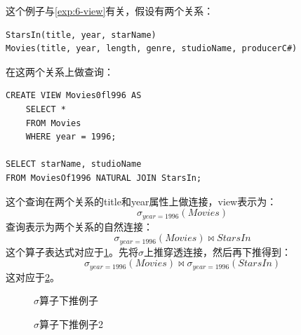 \begin{example}
    这个例子与\examplename\ref{exp:6-view}有关，假设有两个关系：
\begin{lstlisting}[style=verbose]
StarsIn(title, year, starName)
Movies(title, year, length, genre, studioName, producerC#)
\end{lstlisting}
在这两个关系上做查询：
\begin{lstlisting}[style=verbose]
CREATE VIEW Movies0fl996 AS
    SELECT *
    FROM Movies
    WHERE year = 1996;

SELECT starName, studioName
FROM MoviesOf1996 NATURAL JOIN StarsIn;
\end{lstlisting}
    这个查询在两个关系的title和year属性上做连接，view表示为：
    $$\sigma_{year = 1996}(Movies)$$
查询表示为两个关系的自然连接：
    $$\sigma_{year = 1996}(Movies) \bowtie StarsIn$$
    这个算子表达式对应于\figurename\ref{fig:6-select}。先将$\sigma$上推穿透连接，然后再下推得到：
    $$\sigma_{year = 1996}(Movies) \bowtie \sigma_{year = 1996}(StarsIn)$$
    这对应于\figurename\ref{fig:6-select2}。
\end{example}

\begin{figure}[H]
    \centering
    \caption{$\sigma$算子下推例子}\label{fig:6-select}
\end{figure}
\begin{figure}[H]
    \centering
    \caption{$\sigma$算子下推例子2}\label{fig:6-select2}
\end{figure}

